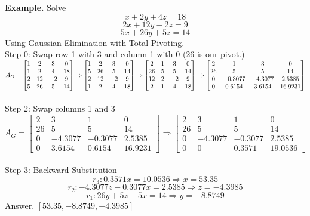 \documentclass [12pt]{article}
\begin{document}
\pagebreak
\noindent\textbf{Example. }Solve
\[x+2y+4z=18\]
\[2x+12y-2z=9\]
\[5x+26y+5z=14\]
Using Gaussian Elimination with Total Pivoting.\\
Step 0: Swap row 1 with 3 and column 1 with 0 (26 is our pivot.)\\
$A_G = \begin{bmatrix}
1&2&3&0\\
1&2&4&18\\
2&12&-2&9\\
5&26&5&14
\end{bmatrix}\Rightarrow \begin{bmatrix}
1&2&3&0\\
5&26&5&14\\
2&12&-2&9\\
1&2&4&18
\end{bmatrix}\Rightarrow\begin{bmatrix}
2&1&3&0\\
26&5&5&14\\
12&2&-2&9\\
2&1&4&18
\end{bmatrix}\\\Rightarrow \begin{bmatrix}
2&1&3&0\\
26&5&5&14\\
0&-0.3077&-4.3077&2.5385\\
0&0.6154&3.6154&16.9231
\end{bmatrix}$\\\\
Step 2: Swap columns 1 and 3\\
$A_G = \begin{bmatrix}
2&3&1&0\\
26&5&5&14\\
0&-4.3077&-0.3077&2.5385\\
0&3.6154&0.6154&16.9231
\end{bmatrix}\Rightarrow\begin{bmatrix}
2&3&1&0\\
26&5&5&14\\
0&-4.3077&-0.3077&2.5385\\
0&0&0.3571&19.0536
\end{bmatrix}$\\\\
Step 3: Backward Substitution
\[r_3: 0.3571x=10.0536\Rightarrow x=53.35\]
\[r_2: -4.3077z-0.3077x=2.5385\Rightarrow z=-4.3985\]
\[r_1: 26y+5z+5x=14\Rightarrow y = -8.8749\]
Answer. $[53.35, -8.8749, -4.3985]$\\\\
\end{document}
